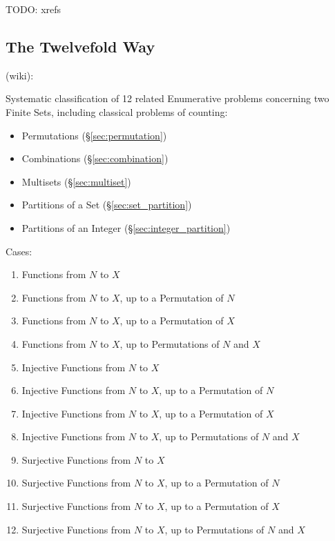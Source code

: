 TODO: xrefs



\subsection{The Twelvefold Way}\label{sec:twelvefold_way}

(wiki):

Systematic classification of 12 related Enumerative problems concerning two
Finite Sets, including classical problems of counting:
\begin{itemize}
  \item Permutations (\S\ref{sec:permutation})
  \item Combinations (\S\ref{sec:combination})
  \item Multisets (\S\ref{sec:multiset})
  \item Partitions of a Set (\S\ref{sec:set_partition})
  \item Partitions of an Integer (\S\ref{sec:integer_partition})
\end{itemize}

Cases:
\begin{enumerate}
  \item Functions from $N$ to $X$
  \item Functions from $N$ to $X$, up to a Permutation of $N$
  \item Functions from $N$ to $X$, up to a Permutation of $X$
  \item Functions from $N$ to $X$, up to Permutations of $N$ and $X$
  \item Injective Functions from $N$ to $X$
  \item Injective Functions from $N$ to $X$, up to a Permutation of $N$
  \item Injective Functions from $N$ to $X$, up to a Permutation of $X$
  \item Injective Functions from $N$ to $X$, up to Permutations of $N$ and $X$
  \item Surjective Functions from $N$ to $X$
  \item Surjective Functions from $N$ to $X$, up to a Permutation of $N$
  \item Surjective Functions from $N$ to $X$, up to a Permutation of $X$
  \item Surjective Functions from $N$ to $X$, up to Permutations of $N$ and $X$
\end{enumerate}



